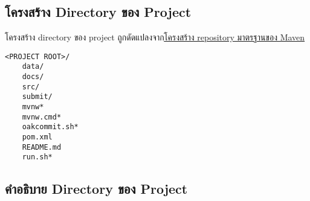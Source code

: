 \clearpage

\rule{0em}{1ex}
\subsection*{โครงสร้าง Directory ของ Project}

โครงสร้าง directory ของ project ถูกดัดแปลงจาก\href{https://maven.apache.org/guides/introduction/introduction-to-the-standard-directory-layout.html}{โครงสร้าง repository มาตรฐานของ Maven}

\setlength{\parindent}{0em}
\setlength{\columnsep}{2pt}
\begin{lstlisting}[title={โครงสร้าง Directory ของ Project},numbers=none]
<PROJECT ROOT>/
    data/
    docs/
    src/
    submit/
    mvnw*
    mvnw.cmd*
    oakcommit.sh*
    pom.xml
    README.md
    run.sh*
\end{lstlisting}

\clearpage

\subsection*{คำอธิบาย Directory ของ Project}

